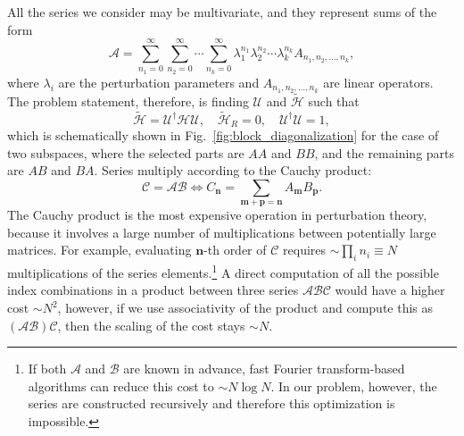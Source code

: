 All the series we consider may be multivariate, and they represent sums of the form
%
\begin{equation}
\mathcal{A} = \sum_{n_1=0}^\infty \sum_{n_2=0}^\infty \cdots \sum_{n_k=0}^\infty \lambda_1^{n_1} \lambda_2^{n_2} \cdots \lambda_k^{n_k} A_{n_1, n_2, \ldots, n_k},
\end{equation}
%
where $\lambda_i$ are the perturbation parameters and $A_{n_1, n_2, \ldots, n_k}$ are linear operators.
%
The problem statement, therefore, is finding $\mathcal{U}$ and $\tilde{\mathcal{H}}$ such that
%
\begin{equation}
\label{eq:problem_definition}
\tilde{\mathcal{H}} = \mathcal{U}^\dagger \mathcal{H} \mathcal{U},\quad \tilde{\mathcal{H}}_{R} = 0,\quad \mathcal{U}^\dagger \mathcal{U} = 1,
\end{equation}
%
which is schematically shown in Fig.~\ref{fig:block_diagonalization} for the case of two subspaces, where the selected parts are $AA$ and $BB$, and the remaining parts are $AB$ and $BA$.
Series multiply according to the Cauchy product:
%
$$
\mathcal{C} = \mathcal{A}\mathcal{B} \Leftrightarrow C_\mathbf{n} = \sum_{\mathbf{m} + \mathbf{p} = \mathbf{n}} A_\mathbf{m} B_\mathbf{p}.
$$
%
The Cauchy product is the most expensive operation in perturbation theory, because it involves a large number of multiplications between potentially large matrices.
For example, evaluating $\mathbf{n}$-th order of $\mathcal{C}$ requires $\sim\prod_i n_i \equiv N$ multiplications of the series elements.\footnote{If both $\mathcal{A}$ and $\mathcal{B}$ are known in advance, fast Fourier transform-based algorithms can reduce this cost to $\sim N \log N$. In our problem, however, the series are constructed recursively and therefore this optimization is impossible.}
A direct computation of all the possible index combinations in a product between three series $\mathcal{A}\mathcal{B}\mathcal{C}$ would have a higher cost $\sim N^2$, however, if we use associativity of the product and compute this as $(\mathcal{A}\mathcal{B})\mathcal{C}$, then the scaling of the cost stays $\sim N$.

